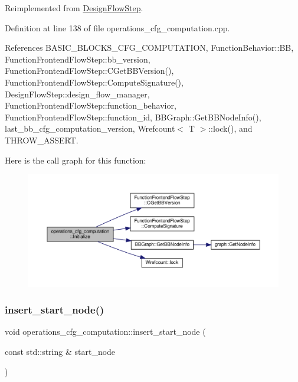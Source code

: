 Reimplemented from \hyperlink{classDesignFlowStep_a44b50683382a094976e1d432a7784799}{Design\+Flow\+Step}.



Definition at line 138 of file operations\+\_\+cfg\+\_\+computation.\+cpp.



References B\+A\+S\+I\+C\+\_\+\+B\+L\+O\+C\+K\+S\+\_\+\+C\+F\+G\+\_\+\+C\+O\+M\+P\+U\+T\+A\+T\+I\+ON, Function\+Behavior\+::\+BB, Function\+Frontend\+Flow\+Step\+::bb\+\_\+version, Function\+Frontend\+Flow\+Step\+::\+C\+Get\+B\+B\+Version(), Function\+Frontend\+Flow\+Step\+::\+Compute\+Signature(), Design\+Flow\+Step\+::design\+\_\+flow\+\_\+manager, Function\+Frontend\+Flow\+Step\+::function\+\_\+behavior, Function\+Frontend\+Flow\+Step\+::function\+\_\+id, B\+B\+Graph\+::\+Get\+B\+B\+Node\+Info(), last\+\_\+bb\+\_\+cfg\+\_\+computation\+\_\+version, Wrefcount$<$ T $>$\+::lock(), and T\+H\+R\+O\+W\+\_\+\+A\+S\+S\+E\+RT.

Here is the call graph for this function\+:
\nopagebreak
\begin{figure}[H]
\begin{center}
\leavevmode
\includegraphics[width=350pt]{d0/d11/classoperations__cfg__computation_ae89b6b5ecac95fdcb9e84ee9bbf527f5_cgraph}
\end{center}
\end{figure}
\mbox{\label{classoperations__cfg__computation_af46dd1597651071b58c65df3a5205a92}} 
\subsubsection{\texorpdfstring{insert\+\_\+start\+\_\+node()}{insert\_start\_node()}}
{\footnotesize\ttfamily void operations\+\_\+cfg\+\_\+computation\+::insert\+\_\+start\+\_\+node (\begin{DoxyParamCaption}\item[{const std\+::string \&}]{start\+\_\+node }\end{DoxyParamCaption})\hspace{0.3cm}{\ttfamily [private]}}




